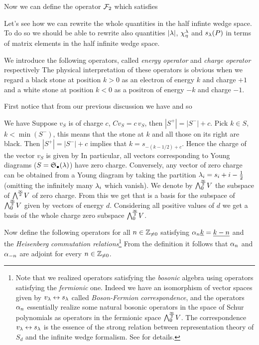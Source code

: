 \documentclass[../main/main.tex]{subfiles}
\begin{document}
Now we can define the operator $\mathcal F_2$ 
which satisfies

Let's see how we can rewrite the whole quantities
in the half infinte wedge space. To do so we should be able to rewrite also quantities $|\lambda|$, $\chi^\lambda_\eta$ and $s_\lambda(P)$ in terms of matrix elements in the half infinite wedge space. 

We introduce the following operators, called \emph{energy operator} and \emph{charge operator} respectively
The physical interpretation of these operators is obvious when we regard a black stone at position $k>0$ as an electron of energy $k$ and charge $+1$ and a white stone at position $k<0$ as a positron of energy $-k$ and charge $-1$. 

First notice that from our previous discussion we have 
and so 


We have 
Suppose $v_S$ is of charge $c$, \ie $Cv_S=c\,v_S$, then $|S^+|=|S^-|+c$. Pick $k\in S$, $k<\min (S^-)$, this means that the stone at $k$ and all those on its right are black. Then $|S^+|=|S^-|+c$ implies that $k=s_{-(k-1/2)+c}$. Hence the charge of the vector $v_S$ is given by
In particular, all vectors corresponding to Young diagrams ($S=\mathfrak S_\bullet(\lambda)$) have zero charge. Conversely, any vector of zero charge can be obtained from a Young diagram by taking the partition $\lambda_i=s_i+i-\frac12$ (omitting the infinitely many $\lambda_i$ which vanish). We denote by $\bigwedge^{\!\frac\infty2}_0\!V$ the subspace of $\bigwedge^{\!\frac\infty2}\!V$ of zero charge. From this we get that 
is a basis for the subspace of $\bigwedge^{\!\frac\infty2}_0\!V$ given by vectors of energy $d$. Considering all positive values of $d$ we get a basis of the whole charge zero subspace $\bigwedge^{\!\frac\infty2}_0\!V$. 

Now define the following operators for all $n\in\mathbb Z_{\neq0}$
satisfying $\alpha_n\underline{k}=\underline{k-n}$ and the \emph{Heisenberg commutation relations}\footnote{Note that we realized operators satisfying the \emph{bosonic} algebra using operators satisfying the \emph{fermionic} one. Indeed we have an isomorphism of vector spaces given by $v_\lambda\leftrightarrow s_\lambda$ called \emph{Boson-Fermion correspondence}, and the operators $\alpha_n$ essentially realize some natural bosonic operators in the space of Schur polynomials as operators in the fermionic space $\bigwedge^{\!\frac\infty2}_0\!V$. The correspondence $v_\lambda\leftrightarrow s_\lambda$ is the essence of the strong relation between representation theory of $S_d$ and the infinite wedge formalism. See \cite{MJD} for details.}
From the definition it follows that $\alpha_n$ and $\alpha_{-n}$ are adjoint for every $n\in\mathbb Z_{\neq0}$.
\end{document}

